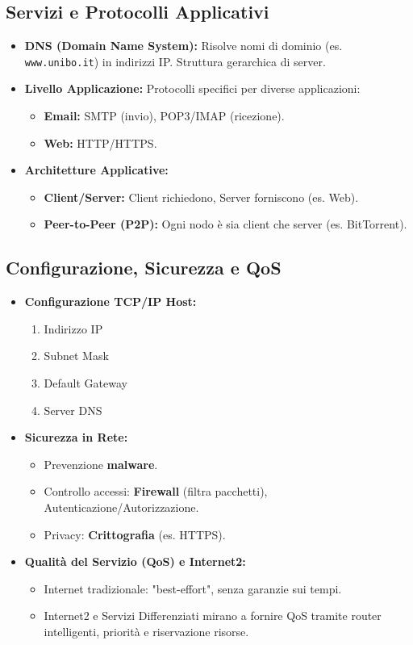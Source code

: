 \subsection{Servizi e Protocolli Applicativi}
\begin{itemize}
    \item \textbf{DNS (Domain Name System):} Risolve nomi di dominio (es. \texttt{www.unibo.it}) in indirizzi IP. Struttura gerarchica di server.
    \item \textbf{Livello Applicazione:} Protocolli specifici per diverse applicazioni:
    \begin{itemize}
        \item \textbf{Email:} SMTP (invio), POP3/IMAP (ricezione).
        \item \textbf{Web:} HTTP/HTTPS.
    \end{itemize}
    \item \textbf{Architetture Applicative:}
    \begin{itemize}
        \item \textbf{Client/Server:} Client richiedono, Server forniscono (es. Web).
        \item \textbf{Peer-to-Peer (P2P):} Ogni nodo è sia client che server (es. BitTorrent).
    \end{itemize}
\end{itemize}

\subsection{Configurazione, Sicurezza e QoS}
\begin{itemize}
    \item \textbf{Configurazione TCP/IP Host:}
    \begin{enumerate}
        \item Indirizzo IP
        \item Subnet Mask
        \item Default Gateway
        \item Server DNS
    \end{enumerate}
    \item \textbf{Sicurezza in Rete:}
    \begin{itemize}
        \item Prevenzione \textbf{malware}.
        \item Controllo accessi: \textbf{Firewall} (filtra pacchetti), Autenticazione/Autorizzazione.
        \item Privacy: \textbf{Crittografia} (es. HTTPS).
    \end{itemize}
    \item \textbf{Qualità del Servizio (QoS) e Internet2:}
    \begin{itemize}
        \item Internet tradizionale: "best-effort", senza garanzie sui tempi.
        \item Internet2 e Servizi Differenziati mirano a fornire QoS tramite router intelligenti, priorità e riservazione risorse.
    \end{itemize}
\end{itemize}

